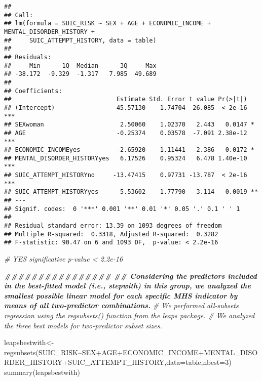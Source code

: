\documentclass[
]{book}
\newenvironment{Shaded}{\begin{snugshade}}{\end{snugshade}}
\newcommand{\AttributeTok}[1]{\textcolor[rgb]{0.77,0.63,0.00}{#1}}
\newcommand{\CommentTok}[1]{\textcolor[rgb]{0.56,0.35,0.01}{\textit{#1}}}
\newcommand{\DecValTok}[1]{\textcolor[rgb]{0.00,0.00,0.81}{#1}}
\newcommand{\DocumentationTok}[1]{\textcolor[rgb]{0.56,0.35,0.01}{\textbf{\textit{#1}}}}
\newcommand{\FunctionTok}[1]{\textcolor[rgb]{0.00,0.00,0.00}{#1}}
\newcommand{\NormalTok}[1]{#1}
\newcommand{\OtherTok}[1]{\textcolor[rgb]{0.56,0.35,0.01}{#1}}
\newcommand{\SpecialCharTok}[1]{\textcolor[rgb]{0.00,0.00,0.00}{#1}}
\begin{document}
\begin{verbatim}
## 
## Call:
## lm(formula = SUIC_RISK ~ SEX + AGE + ECONOMIC_INCOME + MENTAL_DISORDER_HISTORY + 
##     SUIC_ATTEMPT_HISTORY, data = table)
## 
## Residuals:
##     Min      1Q  Median      3Q     Max 
## -38.172  -9.329  -1.317   7.985  49.689 
## 
## Coefficients:
##                             Estimate Std. Error t value Pr(>|t|)    
## (Intercept)                 45.57130    1.74704  26.085  < 2e-16 ***
## SEXwoman                     2.50060    1.02370   2.443   0.0147 *  
## AGE                         -0.25374    0.03578  -7.091 2.38e-12 ***
## ECONOMIC_INCOMEyes          -2.65920    1.11441  -2.386   0.0172 *  
## MENTAL_DISORDER_HISTORYyes   6.17526    0.95324   6.478 1.40e-10 ***
## SUIC_ATTEMPT_HISTORYno     -13.47415    0.97731 -13.787  < 2e-16 ***
## SUIC_ATTEMPT_HISTORYyes      5.53602    1.77790   3.114   0.0019 ** 
## ---
## Signif. codes:  0 '***' 0.001 '**' 0.01 '*' 0.05 '.' 0.1 ' ' 1
## 
## Residual standard error: 13.39 on 1093 degrees of freedom
## Multiple R-squared:  0.3318, Adjusted R-squared:  0.3282 
## F-statistic: 90.47 on 6 and 1093 DF,  p-value: < 2.2e-16
\end{verbatim}

\begin{Shaded}
\begin{Highlighting}[]
\CommentTok{\# YES significative p{-}value \textless{} 2.2e{-}16}


\DocumentationTok{\#\#\#\#\#\#\#\#\#\#\#\#\#\#\#\#}
\DocumentationTok{\#\# Considering the predictors included in the best{-}fitted model (i.e., stepwith) in this group, we analyzed the smallest possible linear model for each specific MHS indicator by means of all two{-}predictor combinations.  }
\CommentTok{\# We performed all{-}subsets regression using the regsubsets() function from the leaps package.}
\CommentTok{\# We analyzed the three best models for two{-}predictor subset sizes.}

\NormalTok{leapsbestwith}\OtherTok{\textless{}{-}}\FunctionTok{regsubsets}\NormalTok{(SUIC\_RISK}\SpecialCharTok{\textasciitilde{}}\NormalTok{SEX}\SpecialCharTok{+}\NormalTok{AGE}\SpecialCharTok{+}\NormalTok{ECONOMIC\_INCOME}\SpecialCharTok{+}\NormalTok{MENTAL\_DISORDER\_HISTORY}\SpecialCharTok{+}\NormalTok{SUIC\_ATTEMPT\_HISTORY,}\AttributeTok{data=}\NormalTok{table,}\AttributeTok{nbest=}\DecValTok{3}\NormalTok{)}
\FunctionTok{summary}\NormalTok{(leapsbestwith)}
\end{Highlighting}
\end{Shaded}
\end{document}
